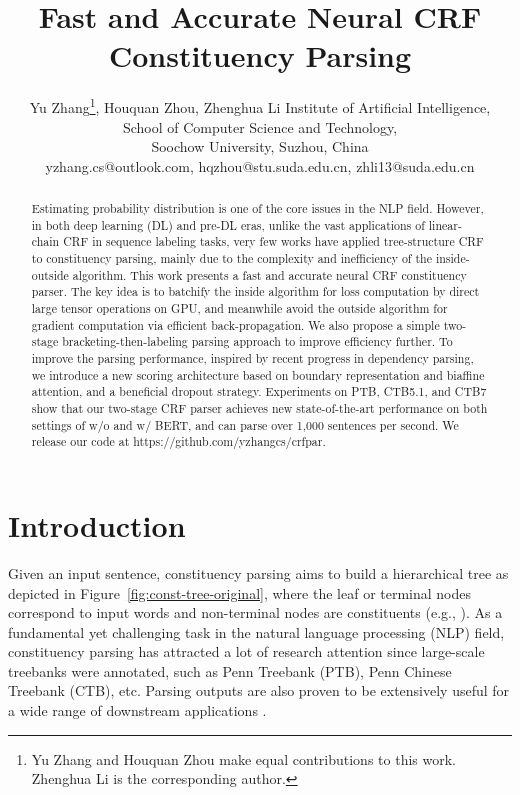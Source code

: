 \documentclass{article}
\title{Fast and Accurate Neural CRF Constituency Parsing}
\author{
Yu Zhang\thanks{Yu Zhang and Houquan Zhou make equal contributions to this work. Zhenghua Li is the corresponding author.},
Houquan Zhou,
Zhenghua Li
\affiliations
Institute of Artificial Intelligence, School of Computer Science and Technology, \\ Soochow University, Suzhou, China \\
\emails
yzhang.cs@outlook.com,
hqzhou@stu.suda.edu.cn,
zhli13@suda.edu.cn
}
\begin{document}
\maketitle

\begin{abstract}
\label{section:abstract}

Estimating probability distribution is one of the core issues in the NLP field. However, in both deep learning (DL) and pre-DL eras, unlike the vast applications of linear-chain CRF in sequence labeling tasks, very few works have applied tree-structure CRF to constituency parsing, mainly due to the complexity and inefficiency of the inside-outside algorithm.
This work presents a fast and accurate neural CRF constituency parser. The key idea is to batchify the inside algorithm for loss computation by direct large tensor operations on GPU, and meanwhile avoid the outside algorithm for gradient computation via efficient back-propagation.
We also propose a simple two-stage bracketing-then-labeling parsing approach to improve efficiency further.
To improve the parsing performance, inspired by recent progress in dependency parsing, we introduce a new scoring architecture
based on boundary representation and biaffine attention, and a beneficial dropout strategy.
Experiments on PTB, CTB5.1, and CTB7 show that our two-stage CRF parser achieves new state-of-the-art performance on both settings of w/o and w/ BERT, and can parse over 1,000 sentences per second.
We release our code at https://github.com/yzhangcs/crfpar.

\end{abstract} \section{Introduction}
\label{section:introduction}

Given an input sentence, constituency parsing aims to build a hierarchical tree as depicted in Figure~\ref{fig:const-tree-original}, where the leaf or terminal nodes correspond to input words and non-terminal nodes are constituents (e.g., ).
As a fundamental yet challenging task in the natural language processing (NLP) field, constituency parsing has attracted a lot of research attention since large-scale treebanks were annotated,  such as Penn Treebank (PTB), Penn Chinese Treebank (CTB), etc.
Parsing outputs are also proven to be extensively useful for a wide range of downstream applications \cite{akoury-etal-2019-syntactically,wang-etal-2018-tree}.
\end{document}
